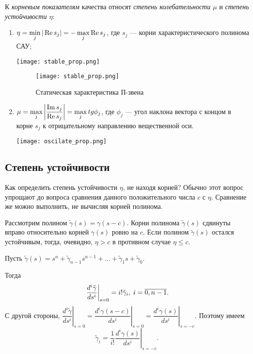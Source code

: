 \documentclass[../../TAU.tex]{subfiles}
\begin{document}
    К {\it корневым показателям} качества относят {\it степень колебательности $\mu$} и {\it степень устойчивости $\eta$}:
    \begin{enumerate}
        \item 
            $\eta=\min\limits_{j}|\mathop{\mathrm{Re}}\nolimits s_j| = -\max\limits_j \mathop{\mathrm{Re}}\nolimits s_j$, где $s_j$ --- корни характеристического полинома САУ;\\
            \begin{center}
            \texttt{[image: stable\_prop.png]}
            \end{center}

            \begin{figure}[h]
                \centering
                \texttt{[image: stable\_prop.png]}
                \caption{Статическая характеристика П-звена}
                \centering
            \end{figure}
        \item 
            $\mu = \max\limits_j\left|\dfrac{\mathop{\mathrm{Im}}\nolimits s_j}{\mathop{\mathrm{Re}}\nolimits s_j}\right| = \max\limits_j tg\phi_j$, где $\phi_j$ --- угол наклона вектора с концом в корне $s_j$ к отрицательному направлению вещественной оси.
            \begin{center}
            \texttt{[image: oscilate\_prop.png]}
            \end{center}
    \end{enumerate}

\subsection{Степень устойчивости}

    Как определить степень устойчивости $\eta$, не находя корней? Обычно этот вопрос упрощают до вопроса сравнения данного положительного числа $c$ с $\eta$. Сравнение же можно выполнить, не вычисляя  корней полинома.

    Рассмотрим полином $\tilde\gamma(s) = \gamma(s-c)$. Корни полинома $\tilde\gamma(s)$ сдвинуты вправо относительно корней $\gamma(s)$ ровно на $c$. Если полином $\tilde\gamma(s)$ остался устойчивым, тогда, очевидно, $\eta > c$ в противном случае $\eta \le c$.

    Пусть $\tilde\gamma(s) = s^n + \tilde\gamma_{n-1}s^{n-1} + \ldots + \tilde\gamma_1 s + \tilde\gamma_0.$

    Тогда
    $$
        \left.\frac{d^i \tilde\gamma}{ds^i}\right|_{s=0} = i!\tilde\gamma_i,\; i=\overline{0,n-1}.
    $$
    С другой стороны, $\left.\dfrac{d^i \tilde\gamma}{ds^i}\right|_{s=0} = \left.\dfrac{d^i \gamma(s-c)}{ds^i}\right|_{s=0}=\left.\dfrac{d^i \gamma(s)}{ds^i}\right|_{s=-c}$. Поэтому имеем
    $$
        \tilde\gamma_i = \frac{1}{i!}\left.\frac{d^i \gamma(s)}{ds^i}\right|_{s=-c}.
    $$
\end{document}
